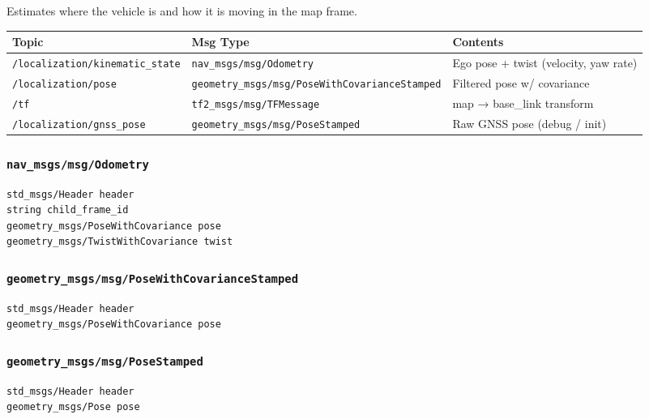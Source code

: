 \documentclass[
]{article}
\begin{document}
Estimates where the vehicle is and how it is moving in the map frame.

\begin{longtable}[]{@{}lll@{}}
\toprule\noalign{}
Topic & Msg Type & Contents \\
\midrule\noalign{}
\endhead
\bottomrule\noalign{}
\endlastfoot
\texttt{/localization/kinematic\_state} &
\texttt{nav\_msgs/msg/Odometry} & Ego pose + twist (velocity, yaw
rate) \\
\texttt{/localization/pose} &
\texttt{geometry\_msgs/msg/PoseWithCovarianceStamped} & Filtered pose w/
covariance \\
\texttt{/tf} & \texttt{tf2\_msgs/msg/TFMessage} & map → base\_link
transform \\
\texttt{/localization/gnss\_pose} &
\texttt{geometry\_msgs/msg/PoseStamped} & Raw GNSS pose (debug /
init) \\
\end{longtable}

\subsubsection{\texorpdfstring{\texttt{nav\_msgs/msg/Odometry}}{nav\_msgs/msg/Odometry}}\label{nav_msgsmsgodometry}

\begin{verbatim}
std_msgs/Header header
string child_frame_id
geometry_msgs/PoseWithCovariance pose
geometry_msgs/TwistWithCovariance twist
\end{verbatim}

\subsubsection{\texorpdfstring{\texttt{geometry\_msgs/msg/PoseWithCovarianceStamped}}{geometry\_msgs/msg/PoseWithCovarianceStamped}}\label{geometry_msgsmsgposewithcovariancestamped}

\begin{verbatim}
std_msgs/Header header
geometry_msgs/PoseWithCovariance pose
\end{verbatim}

\subsubsection{\texorpdfstring{\texttt{geometry\_msgs/msg/PoseStamped}}{geometry\_msgs/msg/PoseStamped}}\label{geometry_msgsmsgposestamped}

\begin{verbatim}
std_msgs/Header header
geometry_msgs/Pose pose
\end{verbatim}
\end{document}
